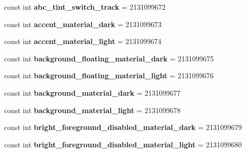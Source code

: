 \begin{DoxyCompactItemize}
const int {\bfseries abc\+\_\+tint\+\_\+switch\+\_\+track} = 2131099672
\item 
\mbox{\label{classst_delivery_1_1_resource_1_1_color_a5c8b22ca13d37f695385364de0092abc}} 
const int {\bfseries accent\+\_\+material\+\_\+dark} = 2131099673
\item 
\mbox{\label{classst_delivery_1_1_resource_1_1_color_a784161b627e68b52e959a9d6550b537f}} 
const int {\bfseries accent\+\_\+material\+\_\+light} = 2131099674
\item 
\mbox{\label{classst_delivery_1_1_resource_1_1_color_a999706fa1f8ceb194a709909f3438de1}} 
const int {\bfseries background\+\_\+floating\+\_\+material\+\_\+dark} = 2131099675
\item 
\mbox{\label{classst_delivery_1_1_resource_1_1_color_a88763ce2991d009f67ae0e671eb7b935}} 
const int {\bfseries background\+\_\+floating\+\_\+material\+\_\+light} = 2131099676
\item 
\mbox{\label{classst_delivery_1_1_resource_1_1_color_ac159ac9f1f568fd921d233bd10a964c6}} 
const int {\bfseries background\+\_\+material\+\_\+dark} = 2131099677
\item 
\mbox{\label{classst_delivery_1_1_resource_1_1_color_a5880d64d1c698433c7dc3a70df45134d}} 
const int {\bfseries background\+\_\+material\+\_\+light} = 2131099678
\item 
\mbox{\label{classst_delivery_1_1_resource_1_1_color_ad33580fa03ffef45bdea0a62e1486d62}} 
const int {\bfseries bright\+\_\+foreground\+\_\+disabled\+\_\+material\+\_\+dark} = 2131099679
\item 
\mbox{\label{classst_delivery_1_1_resource_1_1_color_a23f4a401cedb5392f4641b2227578052}} 
const int {\bfseries bright\+\_\+foreground\+\_\+disabled\+\_\+material\+\_\+light} = 2131099680
\item 
\mbox{\label{classst_delivery_1_1_resource_1_1_color_a997969b773f048e3130de06bb5e0489c}} 

\end{DoxyCompactItemize}
